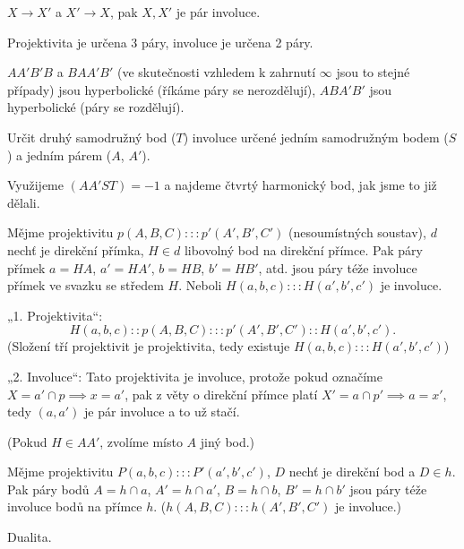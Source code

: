 \documentclass[12pt]{article}					%
\begin{document}

\begin{poznamka}
	$X \rightarrow X'$ a $X' \rightarrow X$, pak $X, X'$ je pár involuce.
\end{poznamka}

\begin{poznamka}
	Projektivita je určena 3 páry, involuce je určena 2 páry.
\end{poznamka}

\begin{dusledek}
	$A A' B' B$ a $B A A' B'$ (ve skutečnosti vzhledem k zahrnutí $∞$ jsou to stejné případy) jsou hyperbolické (říkáme páry se nerozdělují), $A B A' B'$ jsou hyperbolické (páry se rozdělují).
\end{dusledek}

\begin{priklad}[Konstrukce]
	Určit druhý samodružný bod ($T$) involuce určené jedním samodružným bodem ($S$) a jedním párem ($A$, $A'$).

	\begin{reseni}
		Využijeme $(AA'ST) = -1$ a najdeme čtvrtý harmonický bod, jak jsme to již dělali.
	\end{reseni}
\end{priklad}

\begin{veta}
	Mějme projektivitu $p(A, B, C) ::: p'(A', B', C')$ (nesoumístných soustav), $d$ nechť je direkční přímka, $H \in d$ libovolný bod na direkční přímce. Pak páry přímek $a = HA$, $a' = HA'$, $b = HB$, $b' = HB'$, atd. jsou páry téže involuce přímek ve svazku se středem $H$. Neboli $H(a, b, c) ::: H(a', b', c')$ je involuce.

	\begin{dukazin}
		„1. Projektivita“:
		$$ H(a, b, c) :: p(A, B, C) ::: p'(A', B', C') :: H(a', b', c'). $$
		(Složení tří projektivit je projektivita, tedy existuje $H(a, b, c) ::: H(a', b', c')$)

		„2. Involuce“: Tato projektivita je involuce, protože pokud označíme $X = a' \cap p \implies x = a'$, pak z věty o direkční přímce platí $X' = a \cap p' \implies a = x'$, tedy $(a, a')$ je pár involuce a to už stačí.

		(Pokud $H \in AA'$, zvolíme místo $A$ jiný bod.)
	\end{dukazin}
\end{veta}

\begin{veta}
	Mějme projektivitu $P(a, b, c) ::: P'(a', b', c')$, $D$ nechť je direkční bod a $D \in h$. Pak páry bodů $A = h \cap a$, $A' = h \cap a'$, $B = h \cap b$, $B' = h \cap b'$ jsou páry téže involuce bodů na přímce $h$. ($h(A, B, C) ::: h(A', B', C')$ je involuce.)

	\begin{dukazin}
		Dualita.
	\end{dukazin}
\end{veta}
\end{document}
